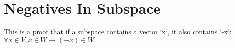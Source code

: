 \section{Negatives In Subspace}

\begin{theorem}
  \label{theorem : subspace_neg}
  \leanok
  This is a proof that if a subspace contains a vector `x`, it also contains `-x`:$ \forall x \in V, x \in W \rightarrow (-x) \in W$
\end{theorem}
